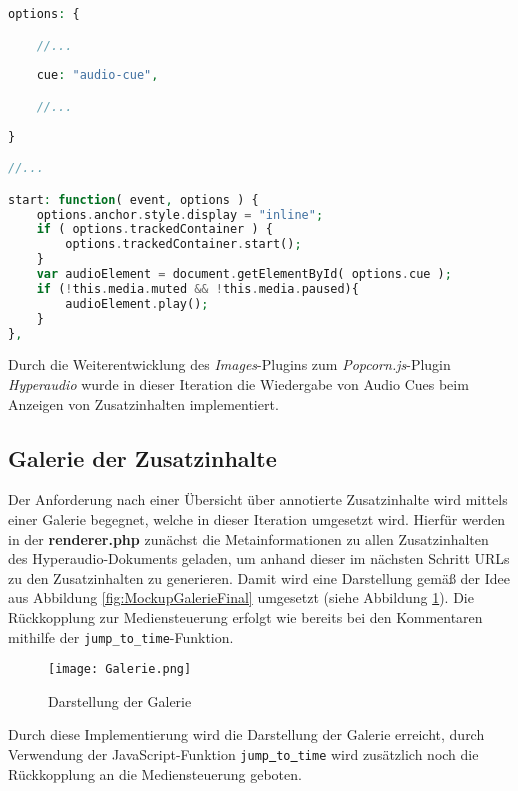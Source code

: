 
\begin{lstlisting}[language=php,
             linewidth=\textwidth,
             caption={Ausschnitt der \textbf{popcorn.hyperaudio.js} in der 7. Iteration},
             label={lst:it7:popcorn.hyperaudio}]
options: {

    //...
    
    cue: "audio-cue",

    //...    
    
}

//...

start: function( event, options ) {
    options.anchor.style.display = "inline";
    if ( options.trackedContainer ) {
        options.trackedContainer.start();
    }
    var audioElement = document.getElementById( options.cue );
    if (!this.media.muted && !this.media.paused){
        audioElement.play();
    }
},
\end{lstlisting}

Durch die Weiterentwicklung des \textit{Images}-Plugins zum \textit{Popcorn.js}-Plugin \textit{Hyperaudio} wurde in dieser Iteration die Wiedergabe von Audio Cues beim Anzeigen von Zusatzinhalten implementiert.

\subsection{Galerie der Zusatzinhalte}
Der Anforderung nach einer Übersicht über annotierte Zusatzinhalte wird mittels einer Galerie begegnet, welche in dieser Iteration umgesetzt wird. Hierfür werden in der \textbf{renderer.php} zunächst die Metainformationen zu allen Zusatzinhalten des Hyperaudio-Dokuments geladen, um anhand dieser im nächsten Schritt URLs zu den Zusatzinhalten zu generieren. Damit wird eine Darstellung gemäß der Idee aus Abbildung \ref{fig:MockupGalerieFinal} umgesetzt (siehe Abbildung \ref{fig:Galerie}). Die Rückkopplung zur Mediensteuerung erfolgt wie bereits bei den Kommentaren mithilfe der \texttt{jump_to_time}-Funktion.

\begin{figure}[h!]
\texttt{[image: Galerie.png]}
\caption{\label{fig:Galerie}Darstellung der Galerie}
\end{figure}

Durch diese Implementierung wird die Darstellung der Galerie erreicht, durch Verwendung der JavaScript-Funktion \texttt{jump\underline{{ }}to\underline{{ }}time} wird zusätzlich noch die Rückkopplung an die Mediensteuerung geboten.



